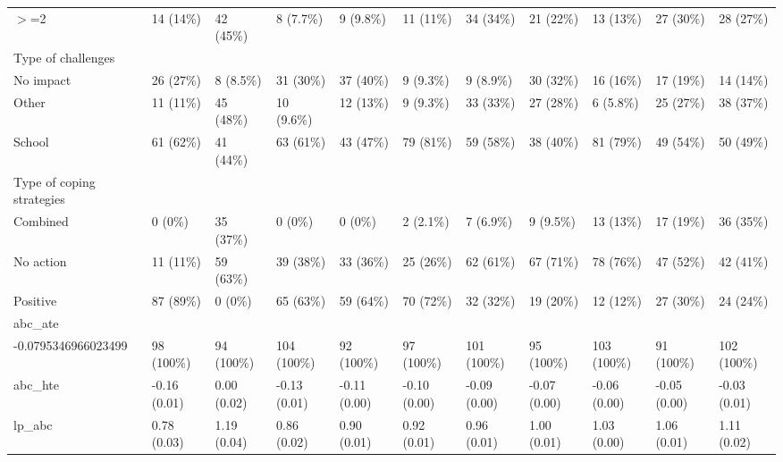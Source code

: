 \begin{table}[ht]
\begin{tabular}{lllllllllll}
  $>$=2 & 14 (14\%) & 42 (45\%) & 8 (7.7\%) & 9 (9.8\%) & 11 (11\%) & 34 (34\%) & 21 (22\%) & 13 (13\%) & 27 (30\%) & 28 (27\%) \\ 
  Type of challenges &  &  &  &  &  &  &  &  &  &  \\ 
  No impact & 26 (27\%) & 8 (8.5\%) & 31 (30\%) & 37 (40\%) & 9 (9.3\%) & 9 (8.9\%) & 30 (32\%) & 16 (16\%) & 17 (19\%) & 14 (14\%) \\ 
  Other & 11 (11\%) & 45 (48\%) & 10 (9.6\%) & 12 (13\%) & 9 (9.3\%) & 33 (33\%) & 27 (28\%) & 6 (5.8\%) & 25 (27\%) & 38 (37\%) \\ 
  School & 61 (62\%) & 41 (44\%) & 63 (61\%) & 43 (47\%) & 79 (81\%) & 59 (58\%) & 38 (40\%) & 81 (79\%) & 49 (54\%) & 50 (49\%) \\ 
  Type of coping strategies &  &  &  &  &  &  &  &  &  &  \\ 
  Combined & 0 (0\%) & 35 (37\%) & 0 (0\%) & 0 (0\%) & 2 (2.1\%) & 7 (6.9\%) & 9 (9.5\%) & 13 (13\%) & 17 (19\%) & 36 (35\%) \\ 
  No action & 11 (11\%) & 59 (63\%) & 39 (38\%) & 33 (36\%) & 25 (26\%) & 62 (61\%) & 67 (71\%) & 78 (76\%) & 47 (52\%) & 42 (41\%) \\ 
  Positive & 87 (89\%) & 0 (0\%) & 65 (63\%) & 59 (64\%) & 70 (72\%) & 32 (32\%) & 19 (20\%) & 12 (12\%) & 27 (30\%) & 24 (24\%) \\ 
  abc\_ate &  &  &  &  &  &  &  &  &  &  \\ 
  -0.0795346966023499 & 98 (100\%) & 94 (100\%) & 104 (100\%) & 92 (100\%) & 97 (100\%) & 101 (100\%) & 95 (100\%) & 103 (100\%) & 91 (100\%) & 102 (100\%) \\ 
  abc\_hte & -0.16 (0.01) & 0.00 (0.02) & -0.13 (0.01) & -0.11 (0.00) & -0.10 (0.00) & -0.09 (0.00) & -0.07 (0.00) & -0.06 (0.00) & -0.05 (0.00) & -0.03 (0.01) \\ 
  lp\_abc & 0.78 (0.03) & 1.19 (0.04) & 0.86 (0.02) & 0.90 (0.01) & 0.92 (0.01) & 0.96 (0.01) & 1.00 (0.01) & 1.03 (0.00) & 1.06 (0.01) & 1.11 (0.02) \\ 
   \hline
\end{tabular}
\end{table}

